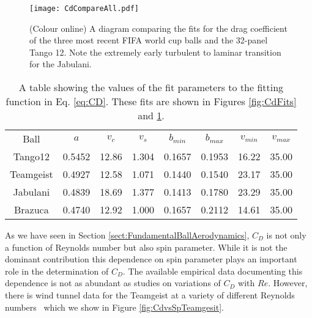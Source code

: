 \documentclass[a4paper]{article}
\begin{document}
%
\begin{figure}[t] 
  \centering
  {\texttt{[image: CdCompareAll.pdf]}}
  \caption{(Colour online) A diagram comparing the fits for the drag coefficient of the three most recent FIFA world cup balls and the 32-panel Tango 12.  Note the extremely early turbulent to laminar transition for the Jabulani.}
 \label{fig:CdFitsCompare}
\end{figure}
%
%
%
\begin{table}[tb!!]
\centering
\begin{tabular}{c|c|c|c|c|c|c|c}
 \hline
\noalign{\vspace{3pt}}
    Ball & $a$ & $v_c$ & $v_s$ & $b_{min}$ & $b_{max}$ & $v_{min}$ & $v_{max}$  \\
\noalign{\vspace{3pt}}
    \hline 
    \hline
\noalign{\vspace{3pt}}
    Tango12 & 0.5452 & 12.86 & 1.304 & 0.1657 & 0.1953 & 16.22 & 35.00\\\hline
    Teamgeist & 0.4927 & 12.58 & 1.071 & 0.1440 & 0.1540 & 23.17 & 35.00\\\hline 
    Jabulani & 0.4839 & 18.69 & 1.377 & 0.1413 & 0.1780 & 23.29 & 35.00\\\hline 
    Brazuca & 0.4740 & 12.92 & 1.000 & 0.1657 & 0.2112 & 14.61 & 35.00\\\hline

\end{tabular}
\caption{A table showing the values of the fit parameters to the fitting function in Eq. \ref{eq:CD}.  These fits are shown in Figures \ref{fig:CdFits} and \ref{fig:CdFitsCompare}.}
\label{table:fit}
\end{table}
%
%
%
%
%
As we have seen in Section \ref{sect:FundamentalBallAerodynamics}, $C_D$ is not only a function of Reynolds number but also spin parameter.  While it is not the dominant contribution this dependence on spin parameter plays an important role in the determination of $C_D$.  The available empirical data documenting this dependence is not as abundant as studies on variations of $C_{D}$ with $Re$. However, there is wind tunnel data for the Teamgeist at a variety of different Reynolds numbers~\cite{AsaiTSeoKKobayashiOandSakashitaR} which we show in Figure \ref{fig:CdvsSpTeamgesit}.
%
\end{document}
